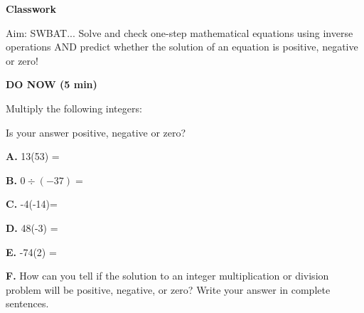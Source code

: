 \documentclass{article}
\begin{document}

{\LARGE \textbf{Classwork}}

{\small Aim: SWBAT... Solve and check one-step mathematical equations using inverse operations AND predict whether the solution of an equation is positive, negative or zero! }
	
	\hlinepagewidth
	
\textbf{DO NOW (5 min)}

\begin{minipage}[t]{0.6\textwidth}
	Multiply the following integers:
	

\end{minipage}
\begin{minipage}[t]{0.4\textwidth}
	Is your answer positive, negative or zero?
\end{minipage}

\hlinepagewidth
\begin{description}
\item{\textbf{A. }} 13(53) = \hfill \answerbox 
\item{\textbf{B. }} $0 \div (-37) =$ \hfill \answerbox
\item{\textbf{C. }} -4(-14)= \hfill \answerbox
\item{\textbf{D. }} 48(-3) = \hfill \answerbox
\item{\textbf{E. }} -74(2) = \hfill \answerbox
\item{\textbf{F. }} How can you tell if the solution to an integer multiplication or division problem will be positive, negative, or zero? Write your answer in complete sentences.
\end{description}				
\end{document}
